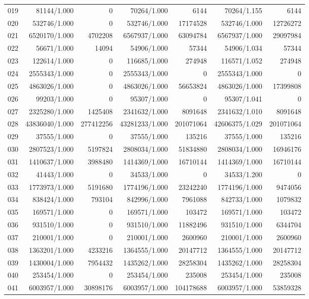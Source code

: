 \begin{longtable}{crrrrrr}
019 & 81144/1.000 & 0 & 70264/1.000 & 6144 & 70264/1.155 & 6144 \\
020 & 532746/1.000 & 0 & 532746/1.000 & 17174528 & 532746/1.000 & 12726272 \\
021 & 6520170/1.000 & 4702208 & 6567937/1.000 & 63094784 & 6567937/1.000 & 29097984 \\
022 & 56671/1.000 & 14094 & 54906/1.000 & 57344 & 54906/1.034 & 57344 \\
023 & 122614/1.000 & 0 & 116685/1.000 & 274948 & 116571/1.052 & 274948 \\
024 & 2555343/1.000 & 0 & 2555343/1.000 & 0 & 2555343/1.000 & 0 \\
025 & 4863026/1.000 & 0 & 4863026/1.000 & 56653824 & 4863026/1.000 & 17399808 \\
026 & 99203/1.000 & 0 & 95307/1.000 & 0 & 95307/1.041 & 0 \\
027 & 2325280/1.000 & 1425408 & 2341632/1.000 & 8091648 & 2341632/1.010 & 8091648 \\
028 & 43836040/1.000 & 277412256 & 43281233/1.000 & 201071064 & 42606375/1.029 & 201071064 \\
029 & 37555/1.000 & 0 & 37555/1.000 & 135216 & 37555/1.000 & 135216 \\
030 & 2807523/1.000 & 5197824 & 2808034/1.000 & 51834880 & 2808034/1.000 & 16946176 \\
031 & 1410637/1.000 & 3988480 & 1414369/1.000 & 16710144 & 1414369/1.000 & 16710144 \\
032 & 41443/1.000 & 0 & 34533/1.000 & 0 & 34533/1.200 & 0 \\
033 & 1773973/1.000 & 5191680 & 1774196/1.000 & 23242240 & 1774196/1.000 & 9474056 \\
034 & 838424/1.000 & 793104 & 842996/1.000 & 7961088 & 842733/1.000 & 1079832 \\
035 & 169571/1.000 & 0 & 169571/1.000 & 103472 & 169571/1.000 & 103472 \\
036 & 931510/1.000 & 0 & 931510/1.000 & 11882496 & 931510/1.000 & 6344704 \\
037 & 210001/1.000 & 0 & 210001/1.000 & 2600960 & 210001/1.000 & 2600960 \\
038 & 1363201/1.000 & 4233216 & 1364555/1.000 & 20147712 & 1364555/1.000 & 20147712 \\
039 & 1430004/1.000 & 7954432 & 1435262/1.000 & 28258304 & 1435262/1.000 & 28258304 \\
040 & 253454/1.000 & 0 & 253454/1.000 & 235008 & 253454/1.000 & 235008 \\
041 & 6003957/1.000 & 30898176 & 6003957/1.000 & 104178688 & 6003957/1.000 & 53859328 \\

\end{longtable}
